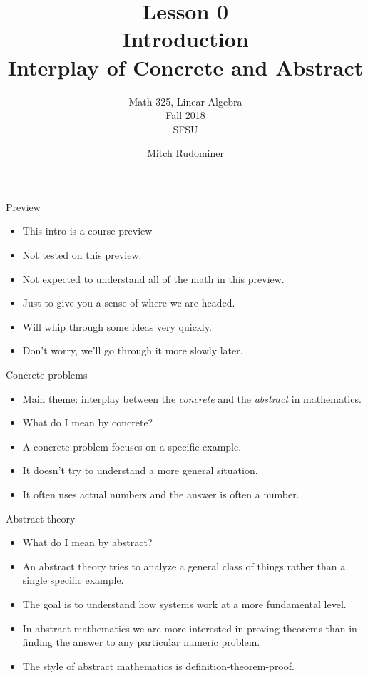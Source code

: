 \documentclass{beamer}
\title{Lesson 0 \\ Introduction \\ Interplay of Concrete and Abstract}
\subtitle{Math 325, Linear Algebra \\ Fall 2018 \\ SFSU}
\author{Mitch Rudominer}
\date{}
\begin{document}
\begin{frame}
  \titlepage
\end{frame}


\begin{frame}{Preview}
\begin{itemize}
\item This intro is a course preview
\item Not tested on this preview.
\item Not expected to understand all of the math in this preview.
\item Just to give you a sense of where we are headed.
\item Will whip through some ideas very quickly.
\item Don't worry, we'll go through it more slowly later.
\end{itemize}
\end{frame}

\begin{frame}{Concrete problems}

  \begin{itemize}
  \item  Main theme: interplay between
  the \emph{concrete} and the \emph{abstract} in mathematics.
  \item What do I mean by concrete?
  \item A concrete problem focuses on a specific example.
  \item It doesn't try to understand a more general situation.
  \item It often uses actual numbers and the answer is often a number.
  \end{itemize}

\end{frame}

\begin{frame}{Abstract theory}

  \begin{itemize}
  \item What do I mean by abstract?
  \item An abstract theory tries to analyze a general class of things rather than a single specific example.
  \item The goal is to understand how systems work at a more fundamental level.
  \item In abstract mathematics we are more interested in proving theorems than in finding the
  answer to any particular numeric problem.
  \item The style of abstract mathematics is definition-theorem-proof.
  \end{itemize}

\end{frame}
\end{document}

